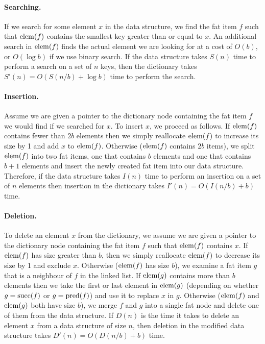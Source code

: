 \documentclass[lotsofwhite]{patmorin}
\begin{document}
\paragraph{Searching.}
If we search for some element $x$ in the data structure, we find the
fat item $f$ such that $\mathrm{elem}(f)$ contains the smallest key greater
than or equal to $x$.  An additional search in $\mathrm{elem}(f)$ finds the
actual element we are looking for at a cost of $O(b)$, or $O(\log b)$
if we use binary search.  If the data structure takes $S(n)$ time to
perform a search on a set of $n$ keys, then the dictionary takes
$S'(n)=O(S(n/b)+\log b)$ time to perform the search.

\paragraph{Insertion.}
Assume we are given a pointer to the dictionary node containing the
fat item $f$ we would find if we searched for $x$.  To insert $x$, we
proceed as follows.  If $\mathrm{elem}(f)$ contains fewer than $2b$ elements
then we simply reallocate $\mathrm{elem}(f)$ to increase its size by 1 and add
$x$ to $\mathrm{elem}(f)$.  Otherwise ($\mathrm{elem}(f)$ contains $2b$ items), we split
$\mathrm{elem}(f)$ into two fat items, one that contains $b$ elements and one
that contains $b+1$ elements and insert the newly created fat item
into our data structure.  Therefore, if the data structure takes
$I(n)$ time to perform an insertion on a set of $n$ elements then
insertion in the dictionary takes $I'(n)=O(I(n/b)+b)$ time.

\paragraph{Deletion.}
To delete an element $x$ from the dictionary, we assume we are given a
pointer to the dictionary node containing the fat item $f$ such that
$\mathrm{elem}(f)$ contains $x$.  If $\mathrm{elem}(f)$ has size greater than $b$, then
we simply reallocate $\mathrm{elem}(f)$ to decrease its size by 1 and exclude
$x$.  Otherwise ($\mathrm{elem}(f)$ has size $b$), we examine a fat item $g$
that is a neighbour of $f$ in the linked list.  If $\mathrm{elem}(g)$ contains
more than $b$ elements then we take the first or last element in
$\mathrm{elem}(g)$ (depending on whether $g=\mathrm{succ}(f)$ or $g=\mathrm{pred}(f)$) and use it
to replace $x$ in $g$.  Otherwise ($\mathrm{elem}(f)$ and $\mathrm{elem}(g)$ both have
size $b$), we merge $f$ and $g$ into a single fat node and delete one
of them from the data structure.  If $D(n)$ is the time it takes to
delete an element $x$ from a data structure of size $n$, then deletion
in the modified data structure takes $D'(n)=O(D(n/b)+b)$ time.
\end{document}
